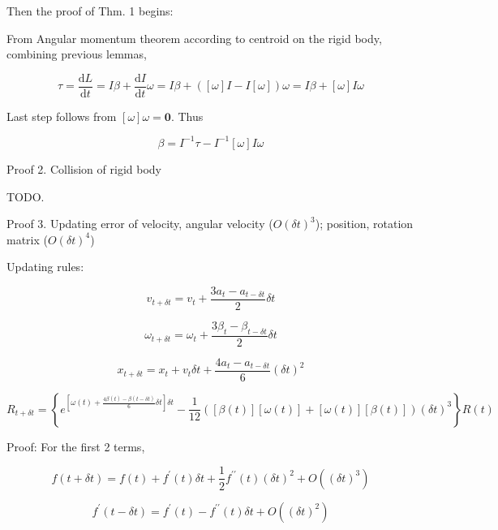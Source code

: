 \documentclass[utf8]{article}
\begin{document}
Then the proof of Thm. 1 begins:

From Angular momentum theorem according to centroid on the rigid body, combining previous lemmas,

\begin{equation}\label{}
  \tau = \frac{\mathrm{d} L}{\mathrm{d}t} = I \beta + \frac{\mathrm{d} I}{\mathrm{d}t} \omega = I \beta + ([\omega]I - I[\omega]) \omega = I \beta + [\omega]I \omega
\end{equation}

Last step follows from $[\omega] \omega = \mathbf{0}$. Thus

\begin{equation}\label{}
  \beta = I^{-1} \tau - I^{-1}[\omega]I \omega
\end{equation}

Proof 2. Collision of rigid body

TODO.

Proof 3. Updating error of velocity, angular velocity ($O(\delta t)^3$); position, rotation matrix ($O(\delta t)^4$)

Updating rules:

\begin{equation}\label{}
  v_{t+\delta t} = v_t + \frac{3a_t - a_{t-\delta t}}{2} \delta t
\end{equation}

\begin{equation}\label{}
  \omega_{t+\delta t} = \omega_t + \frac{3\beta_t - \beta_{t-\delta t}}{2} \delta t
\end{equation}

\begin{equation}\label{}
  x_{t+\delta t} = x_t + v_t \delta t + \frac{4a_t - a_{t-\delta t}}{6} (\delta t)^2
\end{equation}

\begin{equation}\label{}
  R_{t+\delta t} = \left\{e^{[\omega(t) + \frac{4\beta(t)-\beta(t-\delta t)}{6} \delta t] \delta t} - \frac{1}{12}([\beta(t)][\omega(t)] + [\omega(t)][\beta(t)]) (\delta t)^3 \right\} R(t)
\end{equation}

Proof: For the first 2 terms,

\begin{equation}\label{}
  f(t + \delta t) = f(t) + f^\prime (t) \delta t + \frac{1}{2} f^{\prime\prime}(t) (\delta t)^2 + O((\delta t)^3)
\end{equation}

\begin{equation}\label{}
  f^\prime(t - \delta t) = f^\prime (t) - f^{\prime\prime}(t) \delta t + O((\delta t)^2)
\end{equation}
\end{document}
